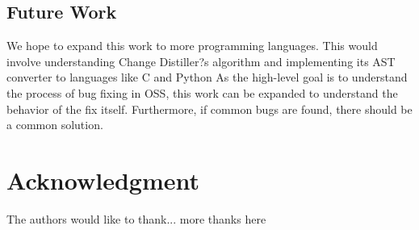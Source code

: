 \documentclass[10pt, conference]{IEEEtran}
\begin{document}
\subsection{Future Work}
We hope to expand this work to more programming languages. This would involve understanding Change Distiller?s algorithm and implementing its AST converter to languages like C and Python As the high-level goal is to understand the process of bug fixing in OSS, this work can be expanded to understand the behavior of the fix itself. Furthermore, if common bugs are found, there should be a common solution.

\section*{Acknowledgment}

The authors would like to thank...
more thanks here



{}



\end{document}

